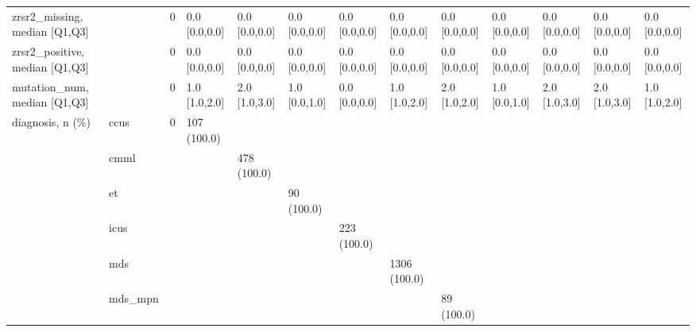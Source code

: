 \begin{tabular}{lllllllllllll}
zrsr2\_missing, median [Q1,Q3] &    &                    0 &       0.0 [0.0,0.0] &      0.0 [0.0,0.0] &        0.0 [0.0,0.0] &       0.0 [0.0,0.0] &     0.0 [0.0,0.0] &     0.0 [0.0,0.0] &     0.0 [0.0,0.0] &        0.0 [0.0,0.0] &       0.0 [0.0,0.0] &        0.0 [0.0,0.0] \\
zrsr2\_positive, median [Q1,Q3] &    &                    0 &       0.0 [0.0,0.0] &      0.0 [0.0,0.0] &        0.0 [0.0,0.0] &       0.0 [0.0,0.0] &     0.0 [0.0,0.0] &     0.0 [0.0,0.0] &     0.0 [0.0,0.0] &        0.0 [0.0,0.0] &       0.0 [0.0,0.0] &        0.0 [0.0,0.0] \\
mutation\_num, median [Q1,Q3] &    &                    0 &       1.0 [1.0,2.0] &      2.0 [1.0,3.0] &        1.0 [0.0,1.0] &       0.0 [0.0,0.0] &     1.0 [1.0,2.0] &     2.0 [1.0,2.0] &     1.0 [0.0,1.0] &        2.0 [1.0,3.0] &       2.0 [1.0,3.0] &        1.0 [1.0,2.0] \\
diagnosis, n (\%) & ccus &                    0 &         107 (100.0) &                    &                      &                     &                   &                   &                   &                      &                     &                      \\
                 & cmml &                      &                     &        478 (100.0) &                      &                     &                   &                   &                   &                      &                     &                      \\
                 & et &                      &                     &                    &           90 (100.0) &                     &                   &                   &                   &                      &                     &                      \\
                 & icus &                      &                     &                    &                      &         223 (100.0) &                   &                   &                   &                      &                     &                      \\
                 & mds &                      &                     &                    &                      &                     &      1306 (100.0) &                   &                   &                      &                     &                      \\
                 & mds\_mpn &                      &                     &                    &                      &                     &                   &        89 (100.0) &                   &                      &                     &                      \\

\end{tabular}
